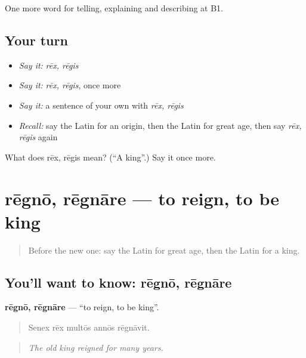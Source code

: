 \begin{grammarlens}[title={What you've built}]
One more word for telling, explaining and describing at B1.
\end{grammarlens}

\subsection*{Your turn}
\begin{itemize}
\raggedright
  \item \emph{Say it:} \emph{rēx, rēgis}
  \item \emph{Say it:} \emph{rēx, rēgis}, once more
  \item \emph{Say it:} a sentence of your own with \emph{rēx, rēgis}
  \item \emph{Recall:} say the Latin for an origin, then the Latin for great age, then say \emph{rēx, rēgis} again
\end{itemize}

\begin{tcolorbox}[breakable,colback=teal!4,colframe=teal!35!black,title={Before you move on}]
What does rēx, rēgis mean? (\textquotedblleft{}A king\textquotedblright{}.) Say it once more.
\end{tcolorbox}
\section[rēgnō, rēgnāre]{rēgnō, rēgnāre — to reign, to be king}

\label{lesson:LA-C345-regno}



\begin{quote}
Before the new one: say the Latin for great age, then the Latin for a king.
\end{quote}

\subsection*{You'll want to know: rēgnō, rēgnāre}
\textbf{rēgnō, rēgnāre} — \textquotedblleft{}to reign, to be king\textquotedblright{}.

\begin{quote}
Senex rēx multōs annōs rēgnāvit.
\end{quote}

\begin{quote}
\emph{The old king reigned for many years.}
\end{quote}

